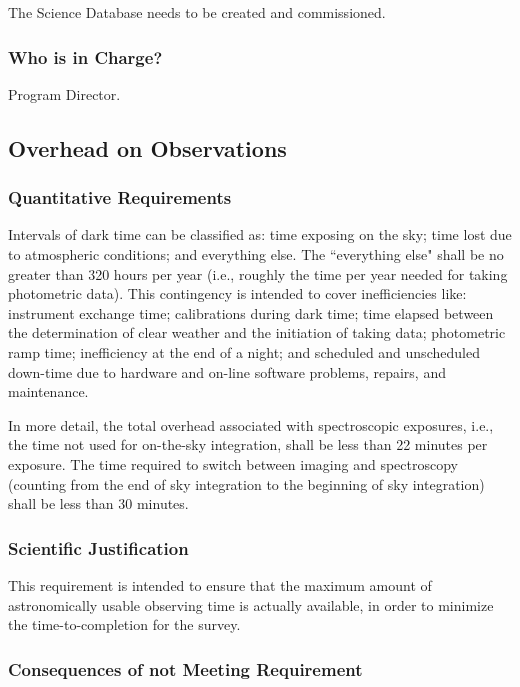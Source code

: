 The Science Database needs to be created and commissioned. 

\subsubsection{Who is in Charge?}

Program Director. 

\subsection{Overhead on Observations}
\label{sec:down}
\subsubsection{Quantitative Requirements}

Intervals of dark time can be classified as: time exposing on the sky; time 
lost due to atmospheric conditions; and everything else.  The ``everything 
else" shall be no greater than 320 hours per year (i.e., roughly the time per 
year needed for taking photometric data).  This contingency is intended to 
cover inefficiencies like: instrument exchange time; calibrations during 
dark time; time elapsed between the determination of clear weather and the 
initiation of taking data; photometric ramp time; inefficiency at the end of 
a night; and scheduled and unscheduled down-time due to hardware and
on-line software 
problems, repairs, and maintenance. 

In more detail, the total overhead associated with spectroscopic exposures, 
i.e., the time not used for on-the-sky integration, shall be less than 22 
minutes per exposure.  The time required to switch between imaging and 
spectroscopy (counting from the end of sky integration to the beginning of 
sky integration) shall be less than 30 minutes. 

\subsubsection{Scientific Justification}

This requirement is intended to ensure that the maximum amount of 
astronomically usable observing time is actually available, in order to 
minimize the time-to-completion for the survey. 

\subsubsection{Consequences of not Meeting Requirement} 

